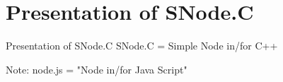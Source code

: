 
\part{Presentation of SNode.C}

\begin{frame}{Presentation of SNode.C}
  \centering%
  {
    \Huge%
    \textcolor{fh-ooe-red}{SNode.C} = \textcolor{fh-ooe-red}{S}imple \textcolor{fh-ooe-red}{Node} in/for \textcolor{fh-ooe-red}{C}++
  }%

  \vspace{1cm}
  Note: \textcolor{fh-ooe-red}{node.js} = "Node in/for Java Script"
\end{frame}
